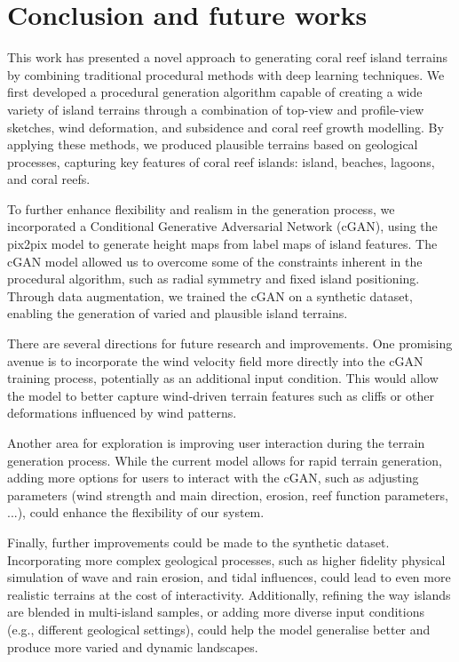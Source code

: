 \section{Conclusion and future works}
\label{sec:coral-island-conclusion}

This work has presented a novel approach to generating coral reef island terrains by combining traditional procedural methods with deep learning techniques. We first developed a procedural generation algorithm capable of creating a wide variety of island terrains through a combination of top-view and profile-view sketches, wind deformation, and subsidence and coral reef growth modelling. By applying these methods, we produced plausible terrains based on geological processes, capturing key features of coral reef islands: island, beaches, lagoons, and coral reefs.

To further enhance flexibility and realism in the generation process, we incorporated a Conditional Generative Adversarial Network (cGAN), using the pix2pix model to generate height maps from label maps of island features. The cGAN model allowed us to overcome some of the constraints inherent in the procedural algorithm, such as radial symmetry and fixed island positioning. Through data augmentation, we trained the cGAN on a synthetic dataset, enabling the generation of varied and plausible island terrains.


There are several directions for future research and improvements. One promising avenue is to incorporate the wind velocity field more directly into the cGAN training process, potentially as an additional input condition. This would allow the model to better capture wind-driven terrain features such as cliffs or other deformations influenced by wind patterns.

Another area for exploration is improving user interaction during the terrain generation process. While the current model allows for rapid terrain generation, adding more options for users to interact with the cGAN, such as adjusting parameters (wind strength and main direction, erosion, reef function parameters, ...), could enhance the flexibility of our system.

Finally, further improvements could be made to the synthetic dataset. Incorporating more complex geological processes, such as higher fidelity physical simulation of wave and rain erosion, and tidal influences, could lead to even more realistic terrains at the cost of interactivity. Additionally, refining the way islands are blended in multi-island samples, or adding more diverse input conditions (e.g., different geological settings), could help the model generalise better and produce more varied and dynamic landscapes.

